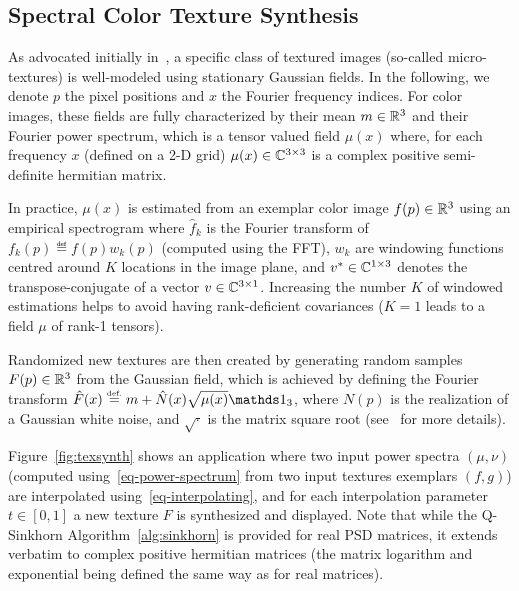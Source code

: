 

\subsection{Spectral Color Texture Synthesis}

As advocated initially in~\cite{galerne2011random}, a specific class of textured images (so-called micro-textures) is well-modeled using stationary Gaussian fields. In the following, we denote $p$ the pixel positions and $x$ the Fourier frequency indices. For color images, these fields are fully characterized by their mean $m \in \mathbb{R}^3$ and their Fourier power spectrum, which is a tensor valued field $\mu(x)$ where, for each frequency $x$ (defined on a 2-D grid) $\mu(x) \in \mathbb{C}^{3 \times 3}$ is a complex positive semi-definite hermitian matrix. 

In practice, $\mu(x)$ is estimated from an exemplar color image $f(p) \in \mathbb{R}^3$ using an empirical spectrogram 
where $\hat f_k$ is the Fourier transform of $f_k(p) \eqdef f(p) w_k(p)$ (computed using the FFT), $w_k$ are windowing functions centred around $K$ locations in the image plane, and $v^* \in \mathbb{C}^{1 \times 3}$ denotes the transpose-conjugate of a vector $v \in \mathbb{C}^{3 \times 1}$. 
%
Increasing the number $K$ of windowed estimations helps to avoid having rank-deficient covariances ($K=1$ leads to a field $\mu$ of rank-1 tensors).

Randomized new textures are then created by generating random samples $F(p) \in \mathbb{R}^3$ from the Gaussian field, which is achieved by defining the Fourier transform $\hat F(x) \eqdef m + \hat N(x) \sqrt{\mu(x)} \ones_3$, where $N(p)$ is the realization of a Gaussian white noise, and $\sqrt{\cdot}$ is the matrix square root (see~\cite{galerne2011random} for more details).

Figure~\ref{fig:texsynth} shows an application where two input power spectra $(\mu,\nu)$ (computed using~\eqref{eq-power-spectrum} from two input textures exemplars $(f,g)$)  are interpolated using~\eqref{eq-interpolating}, and for each interpolation parameter $t \in [0,1]$ a new texture $F$ is synthesized and displayed.
%
Note that while the Q-Sinkhorn Algorithm~\ref{alg:sinkhorn} is provided for real PSD matrices, it extends verbatim to complex positive hermitian matrices (the matrix logarithm and exponential being defined the same way as for real matrices).



